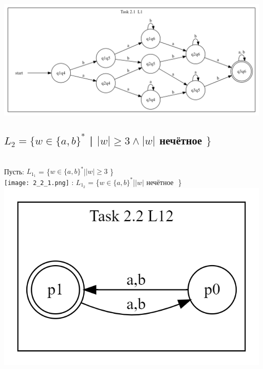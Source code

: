 \documentclass{article}
\begin{document}
\includegraphics[scale=0.18]{2_1_3.png}


\subsection{$L_2 = \{ w \in \{a,b\}^*$ | $  {|w|} \ge 3 \wedge {|w|} $ нечётное $ \} $}\\
Пусть:
$L_1_1$ = \{$ w \in \{a,b\}^*   $|$  {|w|} \ge 3 $ \} \\
\newline\texttt{[image: 2\_2\_1.png]}
:
$L_1_2$ = \{$ w \in \{a,b\}^*   $|$  {|w|} $ нечётное $ $ \} \\
\newline\includegraphics[scale=0.3]{2_2_2.png}
\end{document}
